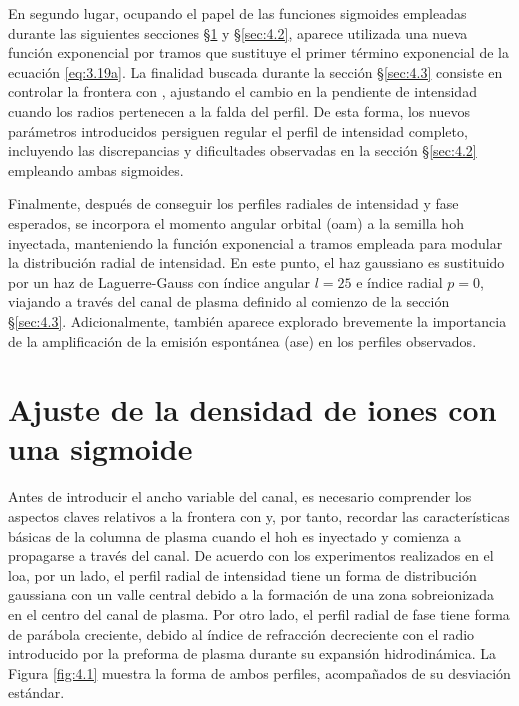 En segundo lugar, ocupando el papel de las funciones sigmoides empleadas durante las siguientes secciones \S\ref{sec:4.1} y \S\ref{sec:4.2}, aparece utilizada una nueva función exponencial por tramos que sustituye el primer término exponencial de la ecuación \eqref{eq:3.19a}. La finalidad buscada durante la sección \S\ref{sec:4.3} consiste en controlar la frontera con , ajustando el cambio en la pendiente de intensidad cuando los radios pertenecen a la falda del perfil. De esta forma, los nuevos parámetros introducidos persiguen regular el perfil de intensidad completo, incluyendo las discrepancias y dificultades observadas en la sección \S\ref{sec:4.2} empleando ambas sigmoides.

Finalmente, después de conseguir los perfiles radiales de intensidad y fase esperados, se incorpora el momento angular orbital (\acrshort{oam}) a la semilla \acrshort{hoh} inyectada, manteniendo la función exponencial a tramos empleada para modular la distribución radial de intensidad. En este punto, el haz gaussiano es sustituido por un haz de Laguerre-Gauss con índice angular $l=25$ e índice radial $p=0$, viajando a través del canal de plasma definido al comienzo de la sección \S\ref{sec:4.3}. Adicionalmente, también aparece explorado brevemente la importancia de la amplificación de la emisión espontánea (\acrshort{ase}) en los perfiles observados.

\section{Ajuste de la densidad de iones con una sigmoide}\label{sec:4.1}
Antes de introducir el ancho variable del canal, es necesario comprender los aspectos claves relativos a la frontera con  y, por tanto, recordar las características básicas de la columna de plasma cuando el \acrshort{hoh} es inyectado y comienza a propagarse a través del canal. De acuerdo con los experimentos realizados en el \acrshort{loa}\autocite{Tuitje2020}, por un lado, el perfil radial de intensidad tiene un forma de distribución gaussiana con un valle central debido a la formación de una zona sobreionizada en el centro del canal de plasma. Por otro lado, el perfil radial de fase tiene forma de parábola creciente, debido al índice de refracción decreciente con el radio introducido por la preforma de plasma durante su expansión hidrodinámica. La Figura \ref{fig:4.1} muestra la forma de ambos perfiles, acompañados de su desviación estándar.


